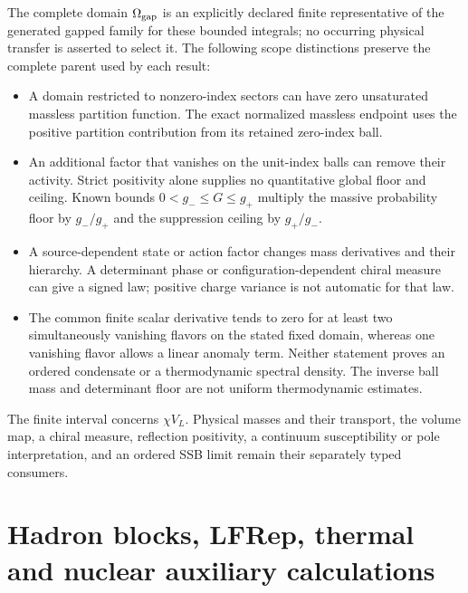 \documentclass[12pt,a4paper]{article}
\begin{document}
The complete domain $\Omega_{\rm gap}$ is an explicitly declared finite
representative of the generated gapped family for these bounded integrals;
no occurring physical transfer is asserted to select it. The following
scope distinctions preserve the complete parent used by each result:
\begin{itemize}
\item A domain restricted to nonzero-index sectors can have zero unsaturated
massless partition function. The exact normalized massless endpoint uses
the positive partition contribution from its retained zero-index ball.
\item An additional factor that vanishes on the unit-index balls can remove
their activity. Strict positivity alone supplies no quantitative global
floor and ceiling. Known bounds $0<g_-\le G\le g_+$ multiply the massive
probability floor by $g_-/g_+$ and the suppression ceiling by $g_+/g_-$.
\item A source-dependent state or action factor changes mass derivatives and
their hierarchy. A determinant phase or configuration-dependent chiral
measure can give a signed law; positive charge variance is not automatic
for that law.
\item The common finite scalar derivative tends to zero for at least two
simultaneously vanishing flavors on the stated fixed domain, whereas one
vanishing flavor allows a linear anomaly term. Neither statement proves
an ordered condensate or a thermodynamic spectral density. The inverse
ball mass and determinant floor are not uniform thermodynamic estimates.
\end{itemize}
The finite interval concerns $\chi V_L$. Physical masses and their transport,
the volume map, a chiral measure, reflection positivity, a continuum
susceptibility or pole interpretation, and an ordered SSB limit remain
their separately typed consumers.





\setlength{\emergencystretch}{2em}


\section{Hadron blocks, LFRep, thermal and nuclear auxiliary calculations}
\label{p13:sec:v237-d4}
\end{document}
